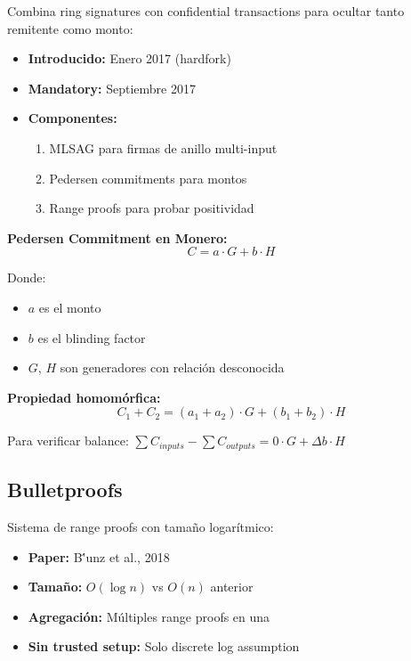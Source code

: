 \documentclass[11pt,a4paper,twoside]{book}
\begin{document}
\begin{definition}[RingCT]
Combina ring signatures con confidential transactions para ocultar tanto remitente como monto:
\begin{itemize}
    \item \textbf{Introducido:} Enero 2017 (hardfork)
    \item \textbf{Mandatory:} Septiembre 2017
    \item \textbf{Componentes:}
    \begin{enumerate}
        \item MLSAG para firmas de anillo multi-input
        \item Pedersen commitments para montos
        \item Range proofs para probar positividad
    \end{enumerate}
\end{itemize}
\end{definition}

\begin{mathnote}
\textbf{Pedersen Commitment en Monero:}
\[
C = a \cdot G + b \cdot H
\]

Donde:
\begin{itemize}
    \item $a$ es el monto
    \item $b$ es el blinding factor
    \item $G$, $H$ son generadores con relaci\'on desconocida
\end{itemize}

\textbf{Propiedad homom\'orfica:}
\[
C_1 + C_2 = (a_1 + a_2) \cdot G + (b_1 + b_2) \cdot H
\]

Para verificar balance: $\sum C_{inputs} - \sum C_{outputs} = 0 \cdot G + \Delta b \cdot H$
\end{mathnote}

\subsection{Bulletproofs}

\begin{definition}[Bulletproofs]
Sistema de range proofs con tama\~no logar\'itmico:
\begin{itemize}
    \item \textbf{Paper:} B\''unz et al., 2018
    \item \textbf{Tama\~no:} $O(\log n)$ vs $O(n)$ anterior
    \item \textbf{Agregaci\'on:} M\'ultiples range proofs en una
    \item \textbf{Sin trusted setup:} Solo discrete log assumption
\end{itemize}
\end{definition}
\end{document}
